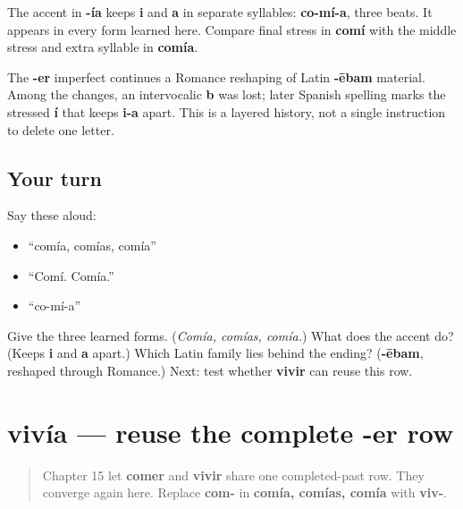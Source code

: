 \begin{grammarlens}[title={Grammar Lens: co-mí-a}]
The accent in \textbf{-ía} keeps \textbf{i} and \textbf{a} in separate syllables: \textbf{co-mí-a}, three beats. It appears in every form learned here. Compare final stress in \textbf{comí} with the middle stress and extra syllable in \textbf{comía}.
\end{grammarlens}

\begin{cousinweb}
The \textbf{-er} imperfect continues a Romance reshaping of Latin \textbf{-ēbam} material. Among the changes, an intervocalic \textbf{b} was lost; later Spanish spelling marks the stressed \textbf{í} that keeps \textbf{i-a} apart. This is a layered history, not a single instruction to delete one letter.
\end{cousinweb}

\subsection*{Your turn}
Say these aloud:

\begin{itemize}
\raggedright
  \item “comía, comías, comía”
  \item “Comí. Comía.”
  \item “co-mí-a”
\end{itemize}

\begin{tcolorbox}[breakable,colback=teal!4,colframe=teal!35!black,title={Before you move on}]
Give the three learned forms. (\emph{Comía, comías, comía.}) What does the accent do? (Keeps \textbf{i} and \textbf{a} apart.) Which Latin family lies behind the ending? (\textbf{-ēbam}, reshaped through Romance.) Next: test whether \textbf{vivir} can reuse this row.
\end{tcolorbox}
\section[vivía]{vivía — reuse the complete -er row}

\label{lesson:ES-C16-vivir-imperfecto}



\begin{quote}
Chapter 15 let \textbf{comer} and \textbf{vivir} share one completed-past row. They converge again here. Replace \textbf{com-} in \textbf{comía, comías, comía} with \textbf{viv-}.
\end{quote}

